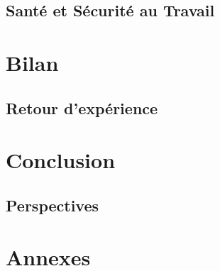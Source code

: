 \documentclass[12pt, oneside, a4paper, titlepage]{report}
\begin{document}
\section{Santé et Sécurité au Travail}%
\label{sec:rse-sst}

\chapter{Bilan}%
\label{cha:bilan}

\section{Retour d'expérience}%
\label{sec:bilan-retexp}

\chapter{Conclusion}%
\label{cha:conclu}

\section{Perspectives}%
\label{sec:conclu-persp}

\chapter{Annexes}%
\label{cha:annexes}

\printbibliography[title={Références}]

\listoffigures

\glsaddall{}
\printglossary[type=main, title=Glossaire, toctitle=Glossaire]
\printglossary[type=\acronymtype]
\end{document}
